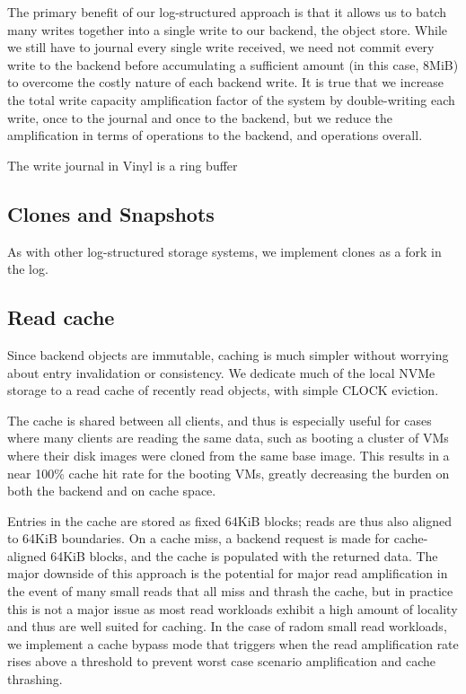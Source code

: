 The primary benefit of our log-structured approach is that it allows us to batch
many writes together into a single write to our backend, the object store. While
we still have to journal every single write received, we need not commit every
write to the backend before accumulating a sufficient amount (in this case,
8MiB) to overcome the costly nature of each backend write. It is true that we
increase the total write capacity amplification factor of the system by
double-writing each write, once to the journal and once to the backend, but we
reduce the amplification in terms of operations to the backend, and operations
overall.

The write journal in Vinyl is a ring buffer 

\subsection{Clones and Snapshots}

As with other log-structured storage systems, we implement clones as a fork in
the log. 

\subsection{Read cache}

Since backend objects are immutable, caching is much simpler without worrying
about entry invalidation or consistency. We dedicate much of the local NVMe
storage to a read cache of recently read objects, with simple CLOCK eviction.

The cache is shared between all clients, and thus is especially useful for cases
where many clients are reading the same data, such as booting a cluster of VMs
where their disk images were cloned from the same base image. This results in a
near 100\% cache hit rate for the booting VMs, greatly decreasing the burden on
both the backend and on cache space.

Entries in the cache are stored as fixed 64KiB blocks; reads are thus also
aligned to 64KiB boundaries. On a cache miss, a backend request is made for
cache-aligned 64KiB blocks, and the cache is populated with the returned data.
The major downside of this approach is the potential for major read
amplification in the event of many small reads that all miss and thrash the
cache, but in practice this is not a major issue as most read workloads exhibit
a high amount of locality and thus are well suited for caching. In the case
of radom small read workloads, we implement a cache bypass mode that triggers
when the read amplification rate rises above a threshold to prevent worst case
scenario amplification and cache thrashing.

